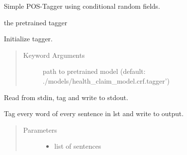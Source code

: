 \documentclass[letterpaper,10pt,english]{sphinxmanual}
\begin{document}
\begin{fulllineitems}
\label{\detokenize{api:pos_tagger.POSTagger}}
Simple POS-Tagger using conditional random fields.

\begin{fulllineitems}
\label{\detokenize{api:pos_tagger.POSTagger.tagger}}
the pretrained tagger

\end{fulllineitems}


\begin{fulllineitems}
\label{\detokenize{api:pos_tagger.POSTagger.__init__}}
Initialize tagger.
\begin{quote}\begin{description}
\item[{Keyword Arguments}] \leavevmode
{} \textendash{} path to pretrained model
(default: ./models/health\_claim\_model.crf.tagger’)

\end{description}\end{quote}

\end{fulllineitems}


\begin{fulllineitems}
\label{\detokenize{api:pos_tagger.POSTagger.pos_tag_io}}
Read from stdin, tag and write to stdout.

\end{fulllineitems}


\begin{fulllineitems}
\label{\detokenize{api:pos_tagger.POSTagger.pos_tag_lst}}
Tag every word of every sentence in lst and write to output.
\begin{quote}\begin{description}
\item[{Parameters}] \leavevmode\begin{itemize}
\item {} 
 \textendash{} list of sentences


\end{itemize}
\end{description}
\end{quote}
\end{fulllineitems}
\end{fulllineitems}
\end{document}

